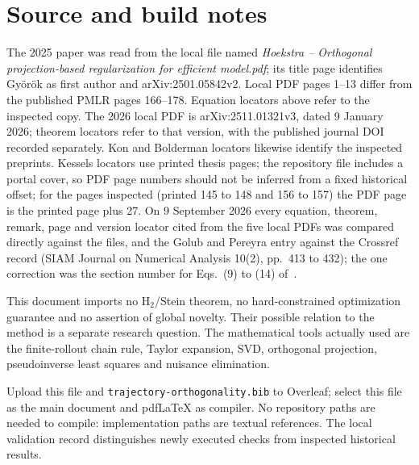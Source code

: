 \documentclass[11pt,a4paper]{article}
\newcommand{\code}[1]{\nolinkurl{#1}}
\theoremstyle{remark}
\begin{document}
\section{Source and build notes}
The 2025 paper was read from the local file named \emph{Hoekstra -- Orthogonal projection-based regularization for efficient model.pdf}; its title page identifies Gy\"or\"ok as first author and arXiv:2501.05842v2. Local PDF pages 1--13 differ from the published PMLR pages 166--178. Equation locators above refer to the inspected copy. The 2026 local PDF is arXiv:2511.01321v3, dated 9 January 2026; theorem locators refer to that version, with the published journal DOI recorded separately. Kon and Bolderman locators likewise identify the inspected preprints. Kessels locators use printed thesis pages; the repository file includes a portal cover, so PDF page numbers should not be inferred from a fixed historical offset; for the pages inspected (printed 145 to 148 and 156 to 157) the PDF page is the printed page plus 27. On 9 September 2026 every equation, theorem, remark, page and version locator cited from the five local PDFs was compared directly against the files, and the Golub and Pereyra entry against the Crossref record (SIAM Journal on Numerical Analysis 10(2), pp.~413 to 432); the one correction was the section number for Eqs.~(9) to (14) of~\cite{gyorok2025}.

This document imports no H$_2$/Stein theorem, no hard-constrained optimization guarantee and no assertion of global novelty. Their possible relation to the method is a separate research question. The mathematical tools actually used are the finite-rollout chain rule, Taylor expansion, SVD, orthogonal projection, pseudoinverse least squares and nuisance elimination.

Upload this file and \code{trajectory-orthogonality.bib} to Overleaf; select this file as the main document and pdfLaTeX as compiler. No repository paths are needed to compile: implementation paths are textual references. The local validation record distinguishes newly executed checks from inspected historical results.


\end{document}
